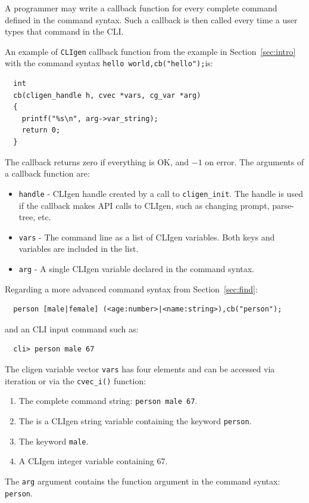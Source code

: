 \documentclass[a4paper, 10pt] {article}
\begin{document}
A programmer may write a callback function for every complete command
defined in the command syntax. Such a callback is then called every
time a user types that command in the CLI.

An example of {\tt CLIgen} callback function from the example in
Section~\ref{sec:intro} with the command syntax {\tt hello world,cb("hello");}is:

\begin{verbatim}
  int 
  cb(cligen_handle h, cvec *vars, cg_var *arg)
  {
    printf("%s\n", arg->var_string);
    return 0;
  }
\end{verbatim}
The callback returns zero if everything is OK, and $-1$ on error. The arguments of a callback
function are:
\begin{itemize}
\item
{\tt handle} - CLIgen handle created by a call to {\tt cligen\_init}. The handle is used if the callback makes API calls to CLIgen, such as changing prompt, parse-tree, etc.
\item
{\tt vars} - The command line as a list of CLIgen variables. Both keys and variables are included in the list.
\item
{\tt arg} - A single CLIgen variable declared in the command syntax.
\end{itemize}

Regarding a more advanced command syntax from Section~\ref{sec:find}:
\begin{verbatim}
  person [male|female] (<age:number>|<name:string>),cb("person");
\end{verbatim}
and an CLI input command such as:
\begin{verbatim}
  cli> person male 67
\end{verbatim}

The cligen variable vector {\tt vars} has four elements and can be accessed via iteration or via the {\tt cvec\_i()} function:
\begin{enumerate}
\item The complete command string: {\tt person male 67}.
\item The is a CLIgen string variable containing the keyword {\tt person}.
\item The keyword {\tt male}.
\item A CLIgen integer variable containing 67.
\end{enumerate}

The {\tt arg} argument contains the function argument in the command syntax: {\tt person}.
\end{document}
